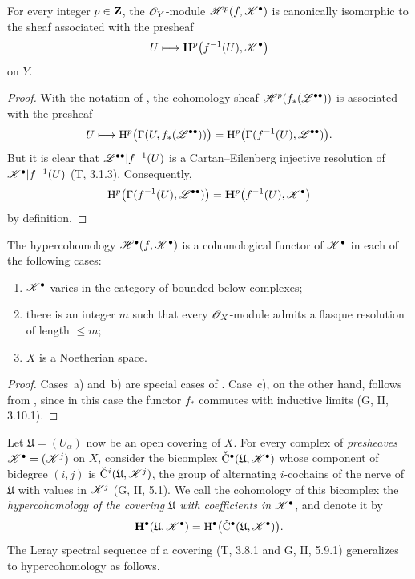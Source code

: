 \begin{proposition}[12.4.3]
\label{0.12.4.3}
For every integer $p\in\mathbf{Z}$, the $\mathscr{O}_Y$-module
$\mathscr{H}^p(f,\mathscr{K}^\bullet)$ is canonically isomorphic to the sheaf
associated with the presheaf
\[
  U\longmapsto
  \mathbf{H}^p\bigl(f^{-1}(U),\mathscr{K}^\bullet\bigr)
\]
on $Y$.
\end{proposition}

\begin{proof}
With the notation of , the cohomology sheaf
$\mathscr{H}^p(f_*(\mathscr{L}^{\bullet\bullet}))$ is associated with the
presheaf
\[
  U\longmapsto
  \mathrm{H}^p\bigl(\Gamma(U,f_*(\mathscr{L}^{\bullet\bullet}))\bigr)
  =
  \mathrm{H}^p\bigl(\Gamma(f^{-1}(U),\mathscr{L}^{\bullet\bullet})\bigr).
\]
But it is clear that
$\mathscr{L}^{\bullet\bullet}|f^{-1}(U)$ is a Cartan--Eilenberg injective
resolution of $\mathscr{K}^\bullet|f^{-1}(U)$ (T, 3.1.3).
Consequently,
\[
  \mathrm{H}^p\bigl(\Gamma(f^{-1}(U),\mathscr{L}^{\bullet\bullet})\bigr)
  =
  \mathbf{H}^p\bigl(f^{-1}(U),\mathscr{K}^\bullet\bigr)
\]
by definition.
\end{proof}

\begin{proposition}[12.4.4]
\label{0.12.4.4}
The hypercohomology $\mathscr{H}^\bullet(f,\mathscr{K}^\bullet)$ is a
cohomological functor of $\mathscr{K}^\bullet$ in each of the following
cases:
\begin{enumerate}
  \item[\rm{a)}] $\mathscr{K}^\bullet$ varies in the category of bounded
    below complexes;
  \item[\rm{b)}] there is an integer $m$ such that every
    $\mathscr{O}_X$-module admits a flasque resolution of length $\leq m$;
  \item[\rm{c)}] $X$ is a Noetherian space.
\end{enumerate}
\end{proposition}

\begin{proof}
Cases~a) and~b) are special cases of .
Case~c), on the other hand, follows from , since in
this case the functor $f_*$ commutes with inductive limits
(G, II, 3.10.1).
\end{proof}

\begin{env}[12.4.5]
\label{0.12.4.5}
Let $\mathfrak{U}=(U_\alpha)$ now be an open covering of $X$.
For every complex of \emph{presheaves}
$\mathscr{K}^\bullet=(\mathscr{K}^j)$ on $X$, consider the bicomplex
$\check{\mathrm{C}}^\bullet(\mathfrak{U},\mathscr{K}^\bullet)$ whose
component of bidegree $(i,j)$ is
$\check{\mathrm{C}}^i(\mathfrak{U},\mathscr{K}^j)$, the group of
alternating $i$-cochains of the nerve of $\mathfrak{U}$ with values
in $\mathscr{K}^j$ (G, II, 5.1).
We call the cohomology of this bicomplex the
\emph{hypercohomology of the covering $\mathfrak{U}$ with
coefficients in $\mathscr{K}^\bullet$}, and denote it by
\[
  \mathbf{H}^\bullet(\mathfrak{U},\mathscr{K}^\bullet)
  =
  \mathrm{H}^\bullet
  \bigl(\check{\mathrm{C}}^\bullet
    (\mathfrak{U},\mathscr{K}^\bullet)\bigr).
\]
The Leray spectral sequence of a covering
(T, 3.8.1 and G, II, 5.9.1) generalizes to hypercohomology as follows.
\end{env}

